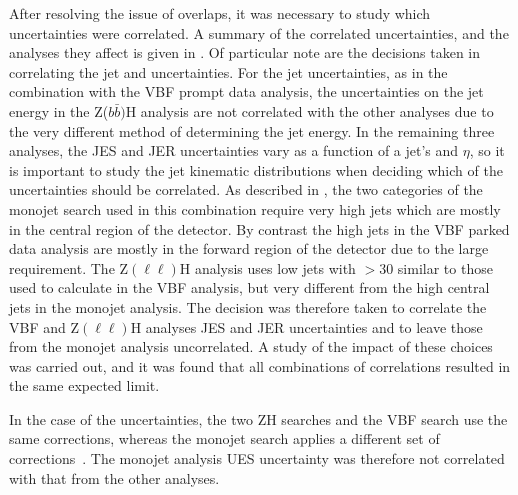 After resolving the issue of overlaps, it was necessary to study which uncertainties were correlated. A summary of the correlated uncertainties, and the analyses they affect is given in . Of particular note are the decisions taken in correlating the jet and \MET uncertainties. For the jet uncertainties, as in the combination with the \ac{VBF} prompt data analysis, the uncertainties on the jet energy in the Z($b\bar{b})$H analysis are not correlated with the other analyses due to the very different method of determining the jet energy. In the remaining three analyses, the \ac{JES} and \ac{JER} uncertainties vary as a function of a jet's \pt and $\eta$, so it is important to study the jet kinematic distributions when deciding which of the uncertainties should be correlated. As described in , the two categories of the monojet search used in this combination require very high \pt jets which are mostly in the central region of the detector. By contrast the high \pt jets in the \ac{VBF} parked data analysis are mostly in the forward region of the detector due to the large \detajj requirement. The Z$(\ell\ell)$H analysis uses low \pt jets with \pt$>30$ \GeV similar to those used to calculate \jetmetdphi in the \ac{VBF} analysis, but very different from the high \pt central jets in the monojet analysis. The decision was therefore taken to correlate the \ac{VBF} and Z$(\ell\ell)$H analyses \ac{JES} and \ac{JER} uncertainties and to leave those from the monojet analysis uncorrelated. A study of the impact of these choices was carried out, and it was found that all combinations of correlations resulted in the same expected limit.

In the case of the \MET uncertainties, the two ZH searches and the \ac{VBF} search use the same \MET corrections, whereas the monojet search applies a different set of corrections~\cite{CMS-PAS-EXO-12-055}. The monojet analysis \ac{UES} uncertainty was therefore not correlated with that from the other analyses.


